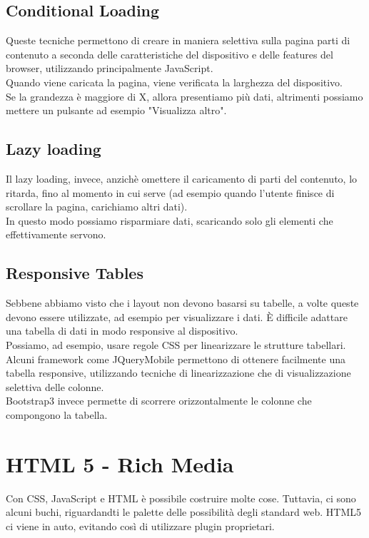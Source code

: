 \documentclass{article}
\begin{document}
\subsection{Conditional Loading}
Queste tecniche permettono di creare in maniera selettiva sulla pagina parti di contenuto a seconda delle caratteristiche del dispositivo e delle features del browser, utilizzando principalmente JavaScript.\\
Quando viene caricata la pagina, viene verificata la larghezza del dispositivo.\\
Se la grandezza è maggiore di X, allora presentiamo più dati, altrimenti possiamo mettere un pulsante ad esempio "Visualizza altro".
\subsection{Lazy loading}
Il lazy loading, invece, anzichè omettere il caricamento di parti del contenuto, lo ritarda, fino al momento in cui serve (ad esempio quando l'utente finisce di scrollare la pagina, carichiamo altri dati).\\
In questo modo possiamo risparmiare dati, scaricando solo gli elementi che effettivamente servono.
\subsection{Responsive Tables}
Sebbene abbiamo visto che i layout non devono basarsi su tabelle, a volte queste devono essere utilizzate, ad esempio per visualizzare i dati. È difficile adattare una tabella di dati in modo responsive al dispositivo.\\
Possiamo, ad esempio, usare regole CSS per linearizzare le strutture tabellari. Alcuni framework come JQueryMobile permettono di ottenere facilmente una tabella responsive, utilizzando tecniche di linearizzazione che di visualizzazione selettiva delle colonne.\\
Bootstrap3 invece permette di scorrere orizzontalmente le colonne che compongono la tabella.
\section{HTML 5 - Rich Media}
Con CSS, JavaScript e HTML è possibile costruire molte cose. Tuttavia, ci sono alcuni buchi, riguardandti le palette delle possibilità degli standard web. HTML5 ci viene in auto, evitando così di utilizzare plugin proprietari.
\end{document}
